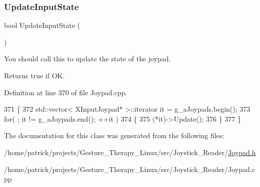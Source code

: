 \subsubsection{\texorpdfstring{Update\+Input\+State}{UpdateInputState}}
{\footnotesize\ttfamily bool Update\+Input\+State (\begin{DoxyParamCaption}{ }\end{DoxyParamCaption})\hspace{0.3cm}{\ttfamily [friend]}}



You should call this to update the state of the joypad. 

\begin{DoxyReturn}{Returns}
true if OK. 
\end{DoxyReturn}


Definition at line 370 of file Joypad.\+cpp.


\begin{DoxyCode}
371 \{
372     std::vector< XInputJoypad* >::iterator it = g\_aJoypads.begin();
373     \textcolor{keywordflow}{for}( ; it != g\_aJoypads.end(); ++it )
374     \{
375         (*it)->Update();
376     \}
377 \}
\end{DoxyCode}


The documentation for this class was generated from the following files\+:\begin{DoxyCompactItemize}
\item 
/home/patrick/projects/\+Gesture\+\_\+\+Therapy\+\_\+\+Linux/src/\+Joystick\+\_\+\+Reader/\hyperlink{_joypad_8h}{Joypad.\+h}\item 
/home/patrick/projects/\+Gesture\+\_\+\+Therapy\+\_\+\+Linux/src/\+Joystick\+\_\+\+Reader/Joypad.\+cpp\end{DoxyCompactItemize}
